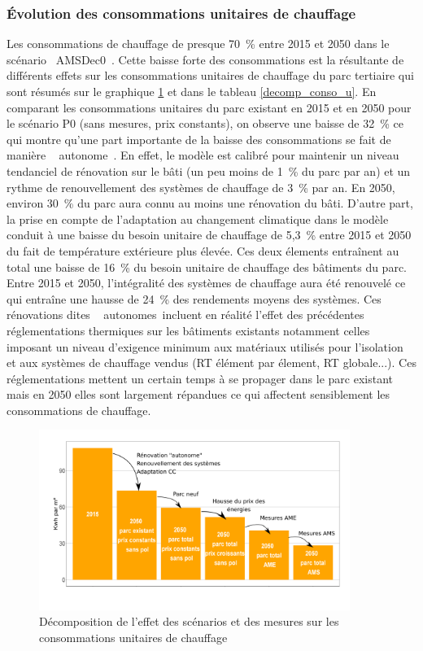 \documentclass[10.5pt,a4paper]{article}
\begin{document}
{\subsubsection{Évolution des consommations unitaires de chauffage}

Les consommations de chauffage de presque 70~\% entre 2015 et 2050 dans le scénario \og~AMSDec0~\fg. Cette baisse forte des consommations est la résultante de différents effets sur les consommations unitaires de chauffage du parc tertiaire qui sont résumés sur le graphique \ref{graph_consultant_consou} et dans le tableau \ref{decomp_conso_u}. En comparant les consommations unitaires du parc existant en 2015 et en 2050 pour le scénario P0 (sans mesures, prix constants), on observe une baisse de 32~\% ce qui montre qu'une part importante de la baisse des consommations se fait de manière \og~ autonome~\fg. En effet, le modèle est calibré pour maintenir un niveau tendanciel de rénovation sur le bâti  (un peu moins de 1~\% du parc par an) et un rythme de renouvellement des systèmes de chauffage de 3~\% par an. En 2050, environ 30~\% du parc aura connu au moins une rénovation du bâti. D'autre part, la prise en compte de l'adaptation au changement climatique dans le modèle conduit à une baisse du besoin unitaire de chauffage de 5,3~\% entre 2015 et 2050 du fait de température extérieure plus élevée. Ces deux élements entraînent au total une baisse de 16~\% du besoin unitaire de chauffage des bâtiments du parc. Entre 2015 et 2050, l'intégralité des systèmes de chauffage aura été renouvelé ce qui entraîne une hausse de 24~\% des rendements moyens des systèmes. Ces rénovations dites \og~ autonomes~\fg incluent en réalité l'effet des précédentes réglementations thermiques sur les bâtiments existants notamment celles imposant un niveau d'exigence minimum aux matériaux utilisés pour l'isolation et aux systèmes de chauffage vendus (RT élément par élement, RT globale...). Ces réglementations mettent un certain temps à se propager dans le parc existant mais en 2050 elles sont largement répandues ce qui affectent sensiblement les consommations de chauffage. 

\begin{figure}[h!]
\centering 
\caption{Décomposition de l'effet des scénarios et des mesures sur les consommations unitaires de chauffage}\label{graph_consultant_consou}  
\includegraphics[width = 0.9\textwidth]{graph_consultant_consou}  
\end{figure}
 
}
\end{document}
